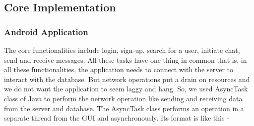\documentclass{article}
\begin{document}
\subsection{Core Implementation}
\subsubsection{Android Application}
The core functionalities include login, sign-up, search for a user, initiate chat, send and receive messages. All these tasks have one thing in common that is, in all these functionalities, the application needs to connect with the server to interact with the database. But network operations put a drain on resources and we do not want the application to seem laggy and hang. So, we used AsyncTask class of Java to perform the network operation like sending and receiving data from the server and database. The AsyncTask class performs an operation in a separate thread from the GUI and asynchronously. Its format is like this - 
\end{document}
